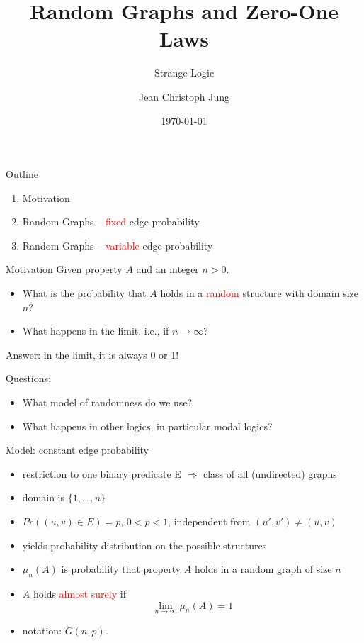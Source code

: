 \documentclass[handout]{beamer}
\title[Random Graphs]{Random Graphs and Zero-One Laws}
\subtitle{Strange Logic}
\author[J. Jung]{Jean Christoph Jung}
\institute[TdKI -- Uni Bremen]{Institut f\"ur Theorie der k\"unstlichen Intelligenz\\ Universit\"at Bremen}
\date{\today}
\renewcommand{\emph}[1]{\textcolor{red}{#1}}
\begin{document}
\titlepage

\begin{frame}{Outline}
\begin{enumerate}
\item Motivation
\item Random Graphs -- \emph{fixed} edge probability
\item Random Graphs -- \emph{variable} edge probability
\end{enumerate}
\end{frame}

\begin{frame}{Motivation}
Given property $A$ and an integer $n>0$. 

\begin{itemize}
\item What is the probability that $A$ holds in a \emph{random} structure with domain size $n$?
\item What happens in the limit, \mbox{i.e.}, if $n\rightarrow\infty$?
\end{itemize}

\pause

Answer: in the limit, it is always 0 or 1!

\pause

Questions:
\begin{itemize}
\item What model of randomness do we use?
\item What happens in other logics, in particular modal logics?
\end{itemize}

\end{frame}

\begin{frame}{Model: constant edge probability}
\begin{itemize}
  \item restriction to one binary predicate E $\Rightarrow$ class of all (undirected) graphs 
  \item domain is $\{1,\ldots,n\}$
  \item $Pr( (u,v)\in E)=p$, $0<p<1$, independent from $(u',v')\neq(u,v)$
  \item yields probability distribution on the possible structures
  \item $\mu_n(A)$ is probability that property $A$ holds in a random graph of size $n$
  \item $A$ holds \emph{almost surely} if 
	$$\lim_{n\rightarrow\infty}\mu_n(A)=1$$
  \item notation: $G(n,p)$.
\end{itemize}
\end{frame}
\end{document}
